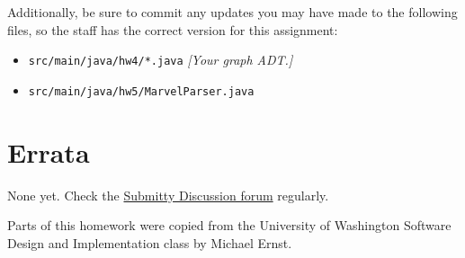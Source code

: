 \documentclass[11pt]{article}
\begin{document}
\noindent Additionally, be sure to commit any updates you may have made to the following files, so the staff has the correct version for this assignment:
\begin{itemize}
\item \texttt{src/main/java/hw4/*.java} \textit{[Your graph ADT.]}
\item \texttt{src/main/java/hw5/MarvelParser.java}
\end{itemize}

\section*{Errata}
None yet. Check the \href{https://submitty.cs.rpi.edu/courses/s23/csci2600/forum}{Submitty Discussion forum} regularly.

\noindent
Parts of this homework were copied from the University of Washington Software Design and Implementation class by Michael Ernst.
\end{document}
